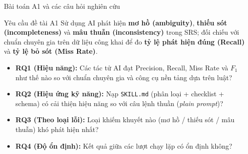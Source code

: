 \documentclass[aspectratio=169,10pt]{beamer}
\begin{document}
\begin{frame}{Bài toán A1 và các câu hỏi nghiên cứu}
  \begin{block}{Yêu cầu đề tài A1}
    Sử dụng AI phát hiện \textbf{mơ hồ (ambiguity)}, \textbf{thiếu sót (incompleteness)} và \textbf{mâu thuẫn (inconsistency)} trong SRS; đối chiếu với chuẩn chuyên gia trên dữ liệu công khai để đo \textbf{tỷ lệ phát hiện đúng (Recall)} và \textbf{tỷ lệ bỏ sót (Miss Rate)}.
  \end{block}
  \vspace{0.2cm}
  \begin{itemize}
    \item \textbf{RQ1 (Hiệu năng):} Các tác tử AI đạt Precision, Recall, Miss Rate và $F_1$ như thế nào so với chuẩn chuyên gia và công cụ nền tảng dựa trên luật?
    \item \textbf{RQ2 (Hiệu ứng kỹ năng):} Nạp \texttt{SKILL.md} (phân loại + checklist + schema) có cải thiện hiệu năng so với câu lệnh thuần (\textit{plain prompt})?
    \item \textbf{RQ3 (Theo loại lỗi):} Loại khiếm khuyết nào (mơ hồ / thiếu sót / mâu thuẫn) khó phát hiện nhất?
    \item \textbf{RQ4 (Độ ổn định):} Kết quả giữa các lượt chạy lặp có ổn định không?
  \end{itemize}
\end{frame}
\end{document}
